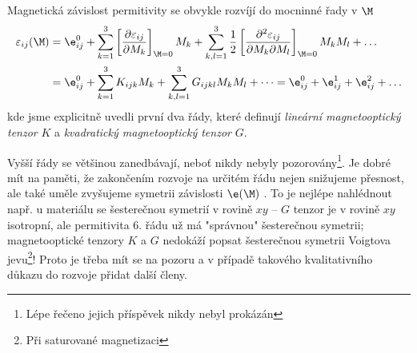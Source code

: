 Magnetická závislost permitivity se obvykle rozvíjí do mocninné řady v $\M$
\begin{align} \label{e:MO tenzory}
\varepsilon_{ij}(\M)&=\e^0_{ij} + \sum_{k=1}^{3}\left[ \frac{\partial \varepsilon_{ij}}{\partial M_k}\right]_{\M=0} M_k + \sum_{k,l=1}^{3} \frac{1}{2}\left[ \frac{\partial^2 \varepsilon_{ij}}{\partial M_k \partial M_l}\right]_{\M=0} M_k M_l + \dots \\
&=\e^0_{ij} + \sum_{k=1}^{3}K_{ijk} M_k + \sum_{k,l=1}^{3} G_{ijkl} M_k M_l + \dots=\e^0_{ij} +\e^1_{ij} +\e^2_{ij} + \dots
\end{align}
kde jsme explicitně uvedli první dva řády, které definují \emph{lineární magnetooptický tenzor} $K$ a \emph{kvadratický magnetooptický tenzor} $G$. \cite{Visbible}

Vyšší řády se většinou zanedbávají, neboť nikdy nebyly pozorovány\footnote{Lépe řečeno jejich příspěvek nikdy nebyl prokázán}.
Je dobré mít na paměti, že zakončením rozvoje na určitém řádu nejen snižujeme přesnost, ale také uměle zvyšujeme symetrii závislosti $\e(\M)$ \cite{Silber}. 
To je nejlépe nahlédnout např. u materiálu se šesterečnou symetrií v rovině $xy$ -- $G$ tenzor je v rovině $xy$ isotropní, ale permitivita 6. řádu už má "správnou" šesterečnou symetrii; magnetooptické tenzory $K$ a $G$ nedokáží popsat šesterečnou symetrii Voigtova jevu\footnote{Při saturované magnetizaci}!
Proto je třeba mít se na pozoru a v případě takového kvalitativního důkazu do rozvoje přidat další členy.

